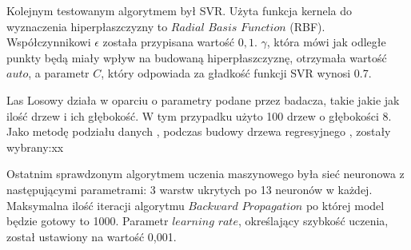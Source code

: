 Kolejnym testowanym algorytmem był SVR. Użyta funkcja kernela do wyznaczenia hiperpłaszczyzny to $Radial$ $Basis$ $Function$ (RBF). Współczynnikowi $\epsilon$ została przypisana wartość $0,1$. $\gamma$, która mówi jak odległe punkty będą miały wpływ na budowaną hiperpłaszczyznę, otrzymała wartość $auto$, a parametr $C$, który odpowiada za gładkość funkcji SVR wynosi 0.7.\par

Las Losowy działa w oparciu o parametry podane przez badacza, takie jakie jak ilość drzew i ich głębokość. W tym przypadku użyto 100 drzew o głębokości 8. Jako metodę podziału danych , podczas budowy drzewa regresyjnego , zostały wybrany:xx\par

Ostatnim sprawdzonym algorytmem uczenia maszynowego była sieć neuronowa z następującymi parametrami: 3 warstw ukrytych po 13 neuronów w każdej. Maksymalna ilość iteracji algorytmu $Backward$ $Propagation$ po której model będzie gotowy to 1000. Parametr $learning$ $rate$, określający szybkość uczenia, został ustawiony na wartość 0,001.\par

